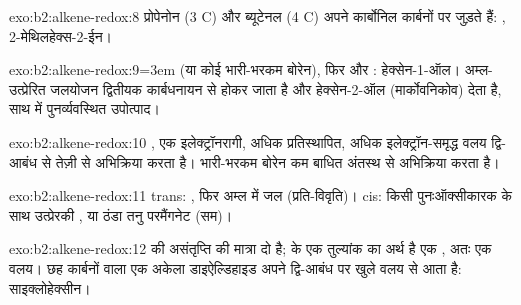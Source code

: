 \begin{solution}{exo:b2:alkene-redox:8}
प्रोपेनोन (3 C) और ब्यूटेनल (4 C) अपने कार्बोनिल कार्बनों पर जुड़ते हैं: ,
2-मेथिलहेक्स-2-ईन।
\end{solution}

\begin{solution}{exo:b2:alkene-redox:9}\emergencystretch=3em
 (या कोई भारी-भरकम बोरेन), फिर  और : हेक्सेन-1-ऑल। अम्ल-उत्प्रेरित जलयोजन
द्वितीयक कार्बधनायन से होकर जाता है और हेक्सेन-2-ऑल (मार्कोवनिकोव) देता है, साथ में
पुनर्व्यवस्थित उपोत्पाद।
\end{solution}

\begin{solution}{exo:b2:alkene-redox:10}
, एक इलेक्ट्रॉनरागी, अधिक प्रतिस्थापित, अधिक इलेक्ट्रॉन-समृद्ध
वलय द्वि-आबंध से तेज़ी से अभिक्रिया करता है। भारी-भरकम बोरेन कम बाधित अंतस्थ  से अभिक्रिया करता है।
\end{solution}

\begin{solution}{exo:b2:alkene-redox:11}
trans: , फिर अम्ल में जल (प्रति-विवृति)। cis: किसी पुनःऑक्सीकारक के साथ उत्प्रेरकी ,
या ठंडा तनु परमैंगनेट (सम)।
\end{solution}

\begin{solution}{exo:b2:alkene-redox:12}
 की असंतृप्ति की मात्रा दो है;  के एक तुल्यांक का अर्थ है एक , अतः
एक वलय। छह कार्बनों वाला एक अकेला डाइऐल्डिहाइड अपने द्वि-आबंध पर खुले वलय से आता है:
साइक्लोहेक्सीन।
\end{solution}

